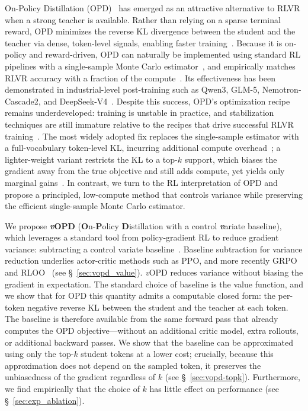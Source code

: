 \documentclass{article}
\newcommand{\method}{\emph{v}OPD}
\begin{document}
On-Policy Distillation (OPD)~\citep{gu2024minillm, agarwal2024onpolicy} has emerged as an attractive alternative to RLVR when a strong teacher is available. Rather than relying on a sparse terminal reward, OPD minimizes the reverse KL divergence between the student and the teacher via dense, token-level signals, enabling faster training~\citep{lightman2024let}. Because it is on-policy and reward-driven, OPD can naturally be implemented using standard RL pipelines with a single-sample Monte Carlo estimator~\citep{lu2025onpolicydistillation}, and empirically matches RLVR accuracy with a fraction of the compute~\citep{patino2025opd}. Its effectiveness has been demonstrated in industrial-level post-training such as Qwen3, GLM-5, Nemotron-Cascade2, and DeepSeek-V4~\citep{yang2025qwen3, zeng2026glm, yang2026nemotron2, deepseekai2026deepseekv4}. Despite this success, OPD's optimization recipe remains underdeveloped: training is unstable in practice, and stabilization techniques are still immature relative to the recipes that drive successful RLVR training~\citep{yu2025dapo, khatri2025art, zheng2025gspo, chen2025minimax, liu2026tricks}. The most widely adopted fix replaces the single-sample estimator with a full-vocabulary token-level KL, incurring additional compute overhead~\citep{agarwal2024onpolicy}; a lighter-weight variant restricts the KL to a top-$k$ support, which biases the gradient away from the true objective and still adds compute, yet yields only marginal gains~\citep{li2026rethinkingopd}. In contrast, we turn to the RL interpretation of OPD and propose a principled, low-compute method that controls variance while preserving the efficient single-sample Monte Carlo estimator.

We propose \textbf{\method{}} (\textbf{O}n-\textbf{P}olicy \textbf{D}istillation with a control \emph{\textbf{v}}ariate baseline), which leverages a standard tool from policy-gradient RL to reduce gradient variance: subtracting a control variate baseline~\citep{williams1992simple, sutton1999policygrad, greensmith2004variance}. Baseline subtraction for variance reduction underlies actor-critic methods such as PPO, and more recently GRPO and RLOO~\citep{schulman2017ppo, mnih2016asynchronous, ahmadian2024back, shao2024deepseekmath} (see \S~\ref{sec:vopd_value}). \method{} reduces variance without biasing the gradient in expectation. The standard choice of baseline is the value function, and we show that for OPD this quantity admits a computable closed form: the per-token negative reverse KL between the student and the teacher at each token. The baseline is therefore available from the same forward pass that already computes the OPD objective---without an additional critic model, extra rollouts, or additional backward passes. We show that the baseline can be approximated using only the top-$k$ student tokens at a lower cost; crucially, because this approximation does not depend on the sampled token, it preserves the unbiasedness of the gradient regardless of $k$ (see \S~\ref{sec:vopd-topk}). Furthermore, we find empirically that the choice of $k$ has little effect on performance (see \S~\ref{sec:exp_ablation}).
\end{document}
